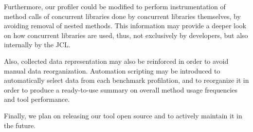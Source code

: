 \documentclass[]{usiinfthesis}
\begin{document}
Furthermore, our profiler could be modified to perform instrumentation of method calls of concurrent libraries done by concurrent libraries themselves, by avoiding removal of nested methods. This information may provide a deeper look on how concurrent libraries are used, thus, not exclusively by developers, but also internally by the JCL.

Also, collected data representation may also be reinforced in order to avoid manual data reorganization. Automation scripting may be introduced to automatically select data from each benchmark profilation, and to reorganize it in order to produce a ready-to-use summary on overall method usage frequencies and tool performance.

Finally, we plan on releasing our tool open source and to actively maintain it in the future.

\backmatter
\end{document}
